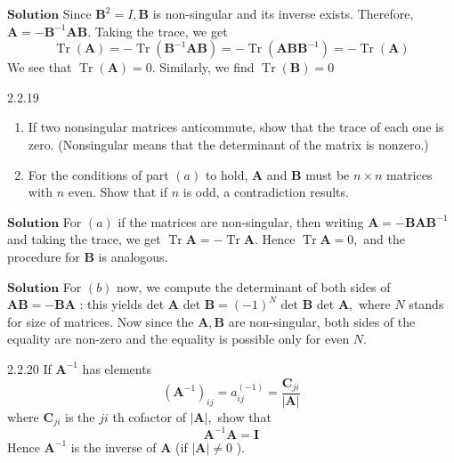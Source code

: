 \documentclass{article}
\begin{document}
\begin{flushleft}
$\boxed{\textbf{Solution}}$ Since $\mathbf{B}^{2}=I, \mathbf{B}$ is non-singular and its inverse exists. Therefore, $\mathbf{A}=-\mathbf{B}^{-1} \mathbf{AB}$. Taking the trace, we get
$$
\operatorname{Tr}(\mathbf{A})=-\operatorname{Tr}\left(\mathbf{B}^{-1} \mathbf{AB}\right)=-\operatorname{Tr}\left(\mathbf{ABB}^{-1}\right)=-\operatorname{Tr}(\mathbf{A})
$$
We see that $\operatorname{Tr}(\mathbf{A})=0 .$ Similarly, we find $\operatorname{Tr}(\mathbf{B})=0$






\begin{mybox}{2.2.19}
\begin{enumerate}[$(a)$]
\item If two nonsingular matrices anticommute, show that the trace of each one is zero.
(Nonsingular means that the determinant of the matrix is nonzero.)
\item For the conditions of part $(a)$ to hold, $\mathbf{A}$ and $\mathbf{B}$ must be $n \times n$ matrices with $n$ even.
Show that if $n$ is odd, a contradiction results.
\end{enumerate}
\end{mybox}

$\boxed{\textbf{Solution}}$ For $(a)$ if the matrices are non-singular, then writing $\mathbf{A}=-\mathbf{B} \mathbf{A} \mathbf{B}^{-1}$ and taking the trace, we get $\operatorname{Tr} \mathbf{A}=-\operatorname{Tr} \mathbf{A} .$ Hence $\operatorname{Tr} \mathbf{A}=0,$ and the procedure for $\mathbf{B}$ is analogous.


$\boxed{\textbf{Solution}}$ For $(b)$ now, we compute the determinant of both sides of $\mathbf{A} \mathbf{B}=-\mathbf{B} \mathbf{A}$ : this yields det $\mathbf{A}$ det $\mathbf{B}=(-1)^{N}$ det $\mathbf{B}$ det $\mathbf{A},$ where $N$ stands for size of matrices. Now since the $\mathbf{A}, \mathbf{B}$ are non-singular, both sides of the equality are non-zero and the equality is possible only for even $N .$




\begin{mybox}{2.2.20}
If $\mathbf{A}^{-1}$ has elements
$$
\left(\mathbf{A}^{-1}\right)_{i j}=a_{i j}^{(-1)}=\frac{\mathbf{C}_{j i}}{|\mathbf{A}|}
$$
where $\mathbf{C}_{j i}$ is the $j i$ th cofactor of $|\mathbf{A}|,$ show that
$$
\mathbf{A}^{-1} \mathbf{A}=\mathbf{I}
$$
Hence $\mathbf{A}^{-1}$ is the inverse of $\mathbf{A}$ (if $|\mathbf{A}| \neq 0$ ).
\end{mybox}


\end{flushleft}
\end{document}

